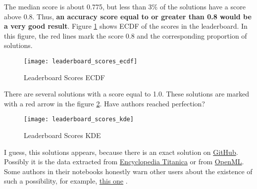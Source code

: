 The median score is about 0.775, but less than 3\% of the solutions have 
a score above 0.8. Thus, \textbf{an accuracy score equal to or greater 
than 0.8 would be a very good result}. Figure \ref{pic:leaderboard_scores_ecdf}
shows ECDF of the scores in the leaderboard. In this figure, the red 
lines mark the score 0.8 and the corresponding proportion of solutions.

\begin{figure}[!ht]
	\centering
	\texttt{[image: leaderboard\_scores\_ecdf]}
	\caption{Leaderboard Scores ECDF}
	\label{pic:leaderboard_scores_ecdf}
\end{figure}

There are several solutions with a score equal to 1.0. These solutions 
are marked with a red arrow in the figure \ref{pic:leaderboard_scores_kde}. 
Have authors reached perfection?

\begin{figure}[!ht]
	\centering
	\texttt{[image: leaderboard\_scores\_kde]}
	\caption{Leaderboard Scores KDE}
	\label{pic:leaderboard_scores_kde}
\end{figure}

I guess, this solutions appears, because there is an exact solution on
\href{https://github.com/thisisjasonjafari/my-datascientise-handcode/raw/master/005-datavisualization/titanic.csv}
{GitHub}. Possibly it is the data extracted from 
\href{https://www.encyclopedia-titanica.org/titanic-survivors/}
{Encyclopedia Titanica}\cite{encyclopedia_titanica} or from
\href{https://www.openml.org/search?type=data&sort=runs&id=40945&status=active}
{OpenML}. Some authors in their notebooks honestly warn other users about 
the existence of such a possibility, for example, 
\href{https://www.kaggle.com/code/suzukifelipe/how-to-be-a-top-lb-explained-for-beginners/notebook?scriptVersionId=99817039}{this one}
\cite{perfection_explanation}.


